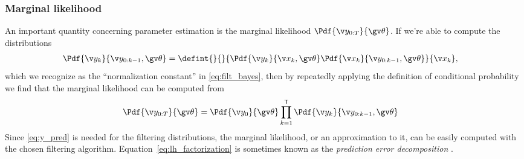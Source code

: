 \subsubsection*{Marginal likelihood}

An important quantity concerning parameter estimation is the marginal likelihood $\Pdf{\Y}{\Th}$. 
If we're able to compute the distributions
\begin{align}
	\Pdf{\y_k}{\y_{0:k-1},\Th}&=\defint{}{}{\Pdf{\yk}{\xk,\Th}\Pdf{\xk}{\y_{0:k-1},\Th}}{\xk},
	\label{eq:y_pred}
\end{align}
which we recognize as the ``normalization constant'' in \eqref{eq:filt_bayes},
then by repeatedly applying the definition of conditional probability 
we find that the marginal likelihood can be computed from
\begin{align}
	\Pdf{\Y}{\Th}&=\Pdf{\y_0}{\Th}\prod_{k=1}^\tr \Pdf{\y_k}{\y_{0:k-1},\Th}
	\label{eq:lh_factorization}
\end{align}
Since \eqref{eq:y_pred} is needed for the filtering distributions, the marginal likelihood, or an approximation to it, can be easily
computed with the chosen filtering algorithm. Equation~\eqref{eq:lh_factorization} is sometimes known 
as the \emph{prediction error decomposition} \parencite{Harvey1990}.




